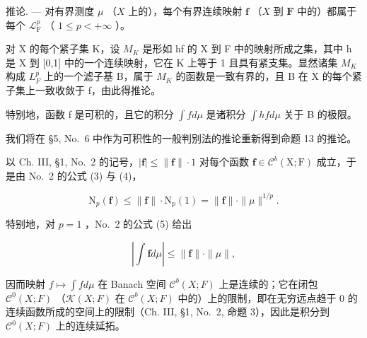 推论. --- 对有界测度 \(\mu\) （\(X\) 上的），每个有界连续映射 \(\mathbf{f}\) （\(X\) 到 \(\mathbf{F}\) 中的）都属于每个 \(\mathcal{L}_{\mathrm{F}}^{p}\) （ \(1 \leqslant p < +\infty\) ）。

对 X 的每个紧子集 K，设 \(M_{K}\) 是形如 hf 的 X 到 F 中的映射所成之集，其中 h 是 X 到 {[}0,1{]} 中的一个连续映射，它在 K 上等于 1 且具有紧支集。显然诸集 \(M_{K}\) 构成 \(L_{F}^{p}\) 上的一个滤子基 B，属于 \(M_{K}\) 的函数是一致有界的，且 B 在 X 的每个紧子集上一致收敛于 f，由此得推论。

特别地，函数 f 是可积的，且它的积分 \(\int f d\mu\) 是诸积分 \(\int h f d\mu\) 关于 B 的极限。

我们将在 §5, No.~6 中作为可积性的一般判别法的推论重新得到命题 13 的推论。

以 Ch. III, §1, No.~2 的记号，\(|\mathbf{f}| \leqslant \| \mathbf{f} \| \cdot 1\) 对每个函数 \(\mathbf{f} \in \mathcal{C}^b(\mathrm{X};\mathrm{F})\) 成立，于是由 No.~2 的公式 (3) 与 (4)，

\[
\mathrm{N} _ {p} (\mathbf {f}) \leqslant \| \mathbf {f} \| \cdot \mathrm{N} _ {p} (1) = \| \mathbf {f} \| \cdot \| \mu \| ^ {1 / p}.\tag{19}
\]

特别地，对 \(p = 1\) ，No.~2 的公式 (5) 给出

\[
\left| \int \mathbf {f} d \mu \right| \leqslant \| \mathbf {f} \| \cdot \| \mu \|,\tag{20}
\]

因而映射 \(f \mapsto \int f d\mu\) 在 Banach 空间 \(\mathcal{C}^{b}(X;F)\) 上是连续的；它在闭包 \(\mathcal{C}^{0}(X;F)\) （\(\mathcal{K}(X;F)\) 在 \(\mathcal{C}^{b}(X;F)\) 中的）上的限制，即在无穷远点趋于 0 的连续函数所成的空间上的限制（Ch. III, §1, No.~2, 命题 3），因此是积分到 \(\mathcal{C}^{0}(X;F)\) 上的连续延拓。
